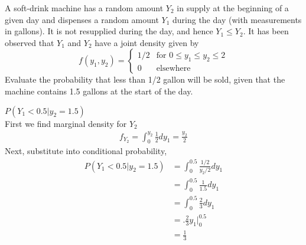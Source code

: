 \documentclass[answers]{exam}
\begin{document}
\begin{questions}
\question 
A soft-drink machine has a random amount $Y_2$ in supply at the beginning of a given day and dispenses a random amount $Y_1$ during the day (with measurements in gallons). It is not resupplied during the day, and hence $Y_1\leq Y_2$. It has been observed that $Y_1$ and $Y_2$ have a joint density given by
\[ f(y_1,y_2) = \begin{cases}
	1/2 & \text{for } 0\leq y_1\leq y_2\leq2 \\ 0 & \text{elsewhere}
\end{cases}\]
Evaluate the probability that less than 1/2 gallon will be sold, given that the machine contains 1.5 gallons at the start of the day.
\begin{solution}
	$P(Y_1<0.5|y_2=1.5)$ \\
	First we find marginal density for $Y_2$
	\begin{align*}
		f_{Y_2} = \int_{0}^{y_2} \frac{1}{2} dy_1 =\frac{y_2}{2}
	\end{align*}
	Next, substitute into conditional probability,
	\begin{align*}
		P(Y_1<0.5|y_2=1.5) 
		&= \int_{0}^{0.5}\frac{1/2}{y_2/2} dy_1 \\
		&= \int_{0}^{0.5}\frac{1}{1.5} dy_1 \\
		&= \int_{0}^{0.5}\frac{2}{3} dy_1 \\
		&= \bigg. \frac{2}{3}y_1 \bigg|_{0}^{0.5} \\
		&= \frac{1}{3}
	\end{align*}
	
\end{solution}

\setcounter{question}{12}


\end{questions}
\end{document}

